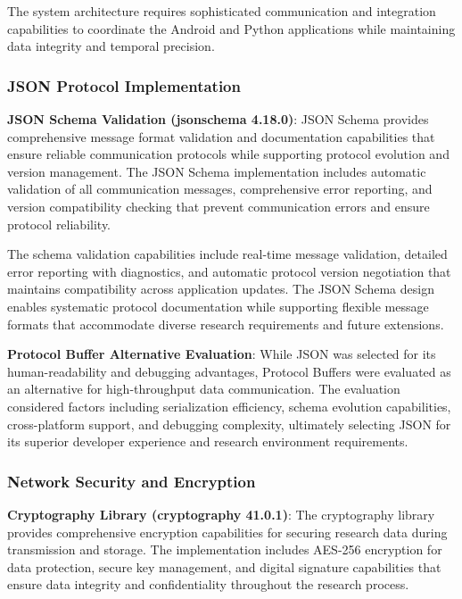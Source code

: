 \documentclass[11pt,a4paper]{report}
\begin{document}
The system architecture requires sophisticated communication and integration capabilities to coordinate the Android and Python applications while maintaining data integrity and temporal precision.

\subsubsection{JSON Protocol Implementation}

\noindent \textbf{JSON Schema Validation (jsonschema 4.18.0)}: JSON Schema provides comprehensive message format validation and documentation capabilities that ensure reliable communication protocols while supporting protocol evolution and version management. The JSON Schema implementation includes automatic validation of all communication messages, comprehensive error reporting, and version compatibility checking that prevent communication errors and ensure protocol reliability.

The schema validation capabilities include real-time message validation, detailed error reporting with diagnostics, and automatic protocol version negotiation that maintains compatibility across application updates. The JSON Schema design enables systematic protocol documentation while supporting flexible message formats that accommodate diverse research requirements and future extensions.

\noindent \textbf{Protocol Buffer Alternative Evaluation}: While JSON was selected for its human-readability and debugging advantages, Protocol Buffers were evaluated as an alternative for high-throughput data communication. The evaluation considered factors including serialization efficiency, schema evolution capabilities, cross-platform support, and debugging complexity, ultimately selecting JSON for its superior developer experience and research environment requirements.

\subsubsection{Network Security and Encryption}

\noindent \textbf{Cryptography Library (cryptography 41.0.1)}: The cryptography library provides comprehensive encryption capabilities for securing research data during transmission and storage. The implementation includes AES-256 encryption for data protection, secure key management, and digital signature capabilities that ensure data integrity and confidentiality throughout the research process.
\end{document}
